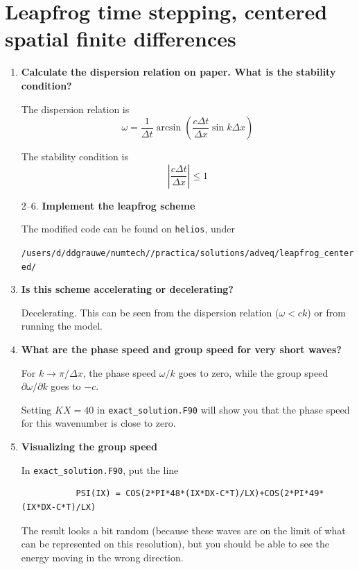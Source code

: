 \documentclass[a4paper,fleqn]{article}
\begin{document}
\section{Leapfrog time stepping, centered spatial finite differences}
%
\begin{enumerate}
	\item \textbf{Calculate the dispersion relation on paper. What is the stability condition?}
		\par
		The dispersion relation is
		\begin{equation*}
			\omega=\frac{1}{\Delta t}\arcsin\left(\frac{c\Delta t}{\Delta x}\sin k\Delta x\right)
		\end{equation*}
		\par
		The stability condition is
		\begin{equation*}
			\left|\frac{c\Delta t}{\Delta x}\right|\leq1
		\end{equation*}\vspace{2ex}
	\item[2--6.] \textbf{Implement the leapfrog scheme}
		\par
		The modified code can be found on \texttt{helios}, under
		\par
		\texttt{/users/d/ddgrauwe/numtech/\unskip/practica/solutions/adveq/leapfrog\_centered/}\vspace{2ex}
	\setcounter{enumi}{6}
	\item \textbf{Is this scheme accelerating or decelerating?}
		\par
		Decelerating. This can be seen from the dispersion relation ($\omega<ck$) or from running the model.\vspace{2ex}
	\item \textbf{What are the phase speed and group speed for very short waves?}
		\par
		For $k\rightarrow\pi/\Delta x$, the phase speed $\omega/k$ goes to zero, while the group speed $\partial \omega/\partial k$ goes to $-c$.
		\par
		Setting $KX=40$ in \texttt{exact\_solution.F90} will show you that the phase speed for this wavenumber is close to zero.\vspace{2ex}
	\item \textbf{Visualizing the group speed}
		\par
		In \texttt{exact\_solution.F90}, put the line
		\begin{verbatim}
		   PSI(IX) = COS(2*PI*48*(IX*DX-C*T)/LX)+COS(2*PI*49*(IX*DX-C*T)/LX)
		\end{verbatim}
		The result looks a bit random (because these waves are on the limit of what can be represented on this resolution), but you should be able to see the energy moving in the wrong direction.
\end{enumerate}
%
\end{document}
